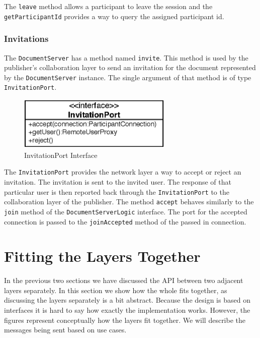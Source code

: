The \texttt{leave} method allows a participant to leave the session and
the \texttt{get\-Participant\-Id} provides a way to query the assigned
participant id.


\subsubsection{Invitations}
\label{archoverview.net.invite}
The \texttt{Document\-Server} has a method named \texttt{invite}. This method
is used by the publisher's collaboration layer to send an invitation for the
document represented by the \texttt{Document\-Server} instance. The single
argument of that method is of type \texttt{Invitation\-Port}.

\begin{figure}[H]
 \centering
 \includegraphics[width=7.37cm,height=2.54cm]{../images/finalreport/architecture_invitationport_uml.eps}
 \caption{InvitationPort Interface}
\end{figure}

The \texttt{Invitation\-Port} provides the network layer a way to accept or
reject an invitation. The invitation is sent to the invited user. The response
of that particular user is then reported back through the 
\texttt{Invitation\-Port} to the collaboration layer of the publisher. The
method \texttt{accept} behaves similarly to the \texttt{join} method of
the \texttt{Document\-Server\-Logic} interface. The port for the accepted 
connection is passed to the \texttt{join\-Accepted} method of the passed
in connection.



\section{Fitting the Layers Together}
In the previous two sections we have discussed the API between two adjacent
layers separately. In this section we show how the whole fits together,
as discussing the layers separately is a bit abstract.
Because the design is based on 
interfaces it is hard to say how exactly the implementation works. However,
the figures represent conceptually how the layers fit together. We will
describe the messages being sent based on use cases.


